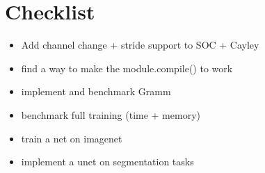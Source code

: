 \section{Checklist}

    \begin{itemize}
        \item Add channel change + stride support to SOC + Cayley
        \item find a way to make the module.compile() to work
        \item implement and benchmark Gramm
        \item benchmark full training (time + memory)
        \item train a net on imagenet
        \item implement a unet on segmentation tasks
    \end{itemize}

